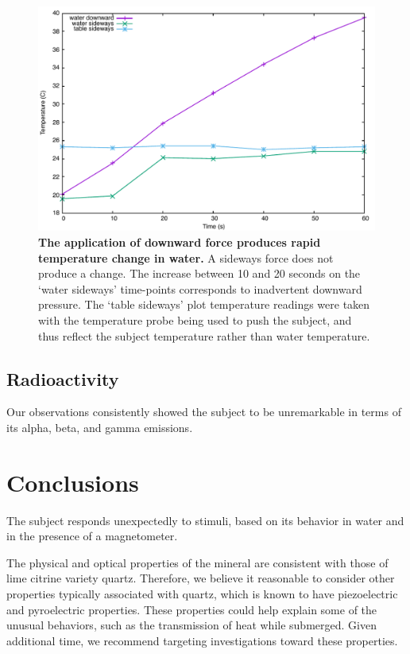 \documentclass[10pt]{article}
\begin{document}
\begin{figure}
\includegraphics[width=1.0\textwidth]{01-temp.pdf}
\caption{\textbf{The application of downward force produces rapid temperature change in water.} A sideways force does not produce a change. The increase between 10 and 20 seconds on the `water sideways' time-points corresponds to inadvertent downward pressure. The `table sideways' plot temperature readings were taken with the temperature probe being used to push the subject, and thus reflect the subject temperature rather than water temperature.}
\end{figure}

\subsection{Radioactivity}
Our observations consistently showed the subject to be unremarkable in terms of its alpha, beta, and gamma emissions.

\section{Conclusions}\label{conclusions}
The subject responds unexpectedly to stimuli, based on its behavior in water and in the presence of a magnetometer.

The physical and optical properties of the mineral are consistent with those of lime citrine variety quartz.
Therefore, we believe it reasonable to consider other properties typically associated with quartz, which is known to have piezoelectric and pyroelectric properties.
These properties could help explain some of the unusual behaviors, such as the transmission of heat while submerged.
Given additional time, we recommend targeting investigations toward these properties.
 
\end{document}
